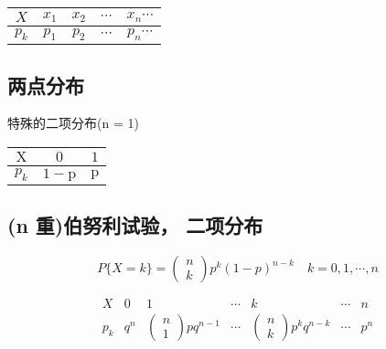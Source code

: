 \begin{center}
    \begin{tabular}{|c|c|c|c|c|}
    \hline $ {X} $ & $ {x}_{1} $ & $ {x}_{2} $ & $ \cdots $ & $ {x}_{n} \cdots $ \\
    \hline $ {p}_{k} $ & $ {p}_{1} $ & $ {p}_{2} $ & $ \cdots $ & $ {p}_{n} \cdots $ \\
    \hline
    \end{tabular}
\end{center}


\subsection{两点分布}

特殊的二项分布(n = 1)
\begin{center}
   \begin{tabular}{|c|c|c|}
    \hline $ \mathrm{X} $ & $0$ & $1 $\\
    \hline$ p_{k} $ & $ 1-\mathrm{p} $ & $ \mathrm{p} $ \\
    \hline
    \end{tabular}

\subsection{(n 重)伯努利试验， 二项分布} 
\end{center}


\begin{equation}
P\{X=k\}=\left(\begin{array}{l}
n \\
k
\end{array}\right) p^{k}(1-p)^{n-k} \quad k=0,1, \cdots, n
\end{equation}

\begin{equation}
\begin{array}{c|cccccc}
{X} & {0} & {1} & \cdots & {k} & \cdots & {n} \\
\hline {p}_{{k}} & {q}^{n} & \left(\begin{array}{l}
{n} \\
{1}
\end{array}\right) {p q}^{n-1} & \cdots & \left(\begin{array}{l}
{n} \\
{k}
\end{array}\right) {p}^{k} {q}^{n-k} & \cdots & {p}^{n}
\end{array}
\end{equation}


